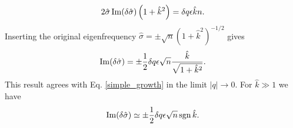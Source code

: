  \begin{align}
   2\hat{\sigma}\operatorname{Im}(\delta\hat{\sigma})
  \left(1+\hat{k}^2\right) = \delta q \epsilon \hat{k} n.
 \end{align}
Inserting the original eigenfrequency $\hat{\sigma} = \pm
\sqrt{n}(1+\hat{k}^2)^{-1/2}$ gives
\begin{align}
  \operatorname{Im}(\delta\hat{\sigma})= \pm \frac{1}{2}\delta q \epsilon
  \sqrt{n} \frac{\hat{k}}{\sqrt{1+\hat{k}^2}}. 
\end{align}
This result agrees with Eq. \ref{simple_growth} in the limit
$|q|\to0$. 
For $\hat{k}\gg 1$ we have
\begin{align}
  \operatorname{Im}(\delta\hat{\sigma})\simeq \pm \frac{1}{2}\delta q \epsilon
  \sqrt{n} \operatorname{sgn}{\hat{k}}. 
\end{align}





